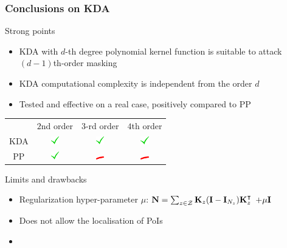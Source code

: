 \begin{frame}
\frametitle{Conclusions on KDA}
\vspace*{-10pt}
\begin{block}{Strong points}
\begin{itemize}
\item KDA with $d$-th degree polynomial kernel function is suitable to attack $(d-1)$th-order masking
\item KDA computational complexity is independent from the order $d$
\item Tested and effective on a real case, positively compared to PP 
\end{itemize}
\begin{table}[]
\begin{tabular}{cccc}
    & $2$nd order & $3$-rd order & $4$th order \\
KDA & \includegraphics[width=10pt]{figures/yes.png}          & \includegraphics[width=10pt]{figures/yes.png}           & \includegraphics[width=10pt]{figures/yes.png}          \\
PP  & \includegraphics[width=10pt]{figures/yes.png}          & \includegraphics[width=10pt]{figures/no.png}            & \includegraphics[width=10pt]{figures/no.png}          
\end{tabular}
\end{table}
\end{block}

\begin{block}{Limits and drawbacks}
\begin{itemize}
\item Regularization hyper-parameter $\mu$: $\textbf{N} = \sum_{z\in\mathcal{Z}}\textbf{K}_z(\textbf{I} - \textbf{I}_{N_{z}})\textbf{K}_z^\intercal$ \textcolor{red}{$+ \mu\textbf{I}$}
\item Does not allow the localisation of PoIs
\item {}
\end{itemize}

\end{block}

\end{frame}
